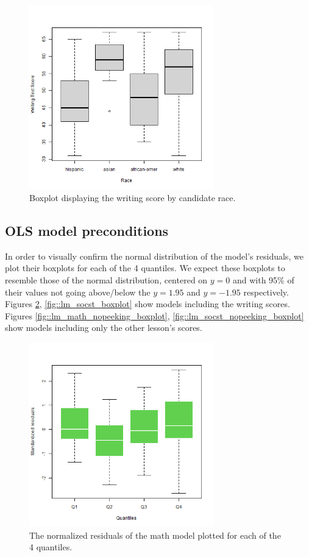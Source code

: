 \documentclass[10pt]{article}
\begin{document}
	\begin{figure}
		\includegraphics[width=8cm]{write_race_boxplot.png}
		\centering
		\caption{Boxplot displaying the writing score by candidate race.}
		\label{fig::write_race_boxplot}
	\end{figure}
	
	
	\subsection{OLS model preconditions}
	
	In order to visually confirm the normal distribution of the model's residuals, we plot their boxplots for each of the 4 quantiles. We expect these boxplots to resemble those of the normal distribution, centered on $y=0$ and with 95\% of their values not going above/below the $y=1.95$ and $y=-1.95$ respectively. Figures \ref{fig::lm_math_boxplot}, \ref{fig::lm_socst_boxplot} show models including the writing scores. Figures \ref{fig::lm_math_nopeeking_boxplot}, \ref{fig::lm_socst_nopeeking_boxplot} show models including only the other lesson's scores.
	
	\begin{figure}
		\includegraphics[width=8cm]{lm_math_residual_boxplot.png}
		\centering
		\caption{The normalized residuals of the math model plotted for each of the 4 quantiles.}
		\label{fig::lm_math_boxplot}
	\end{figure}
\end{document}
